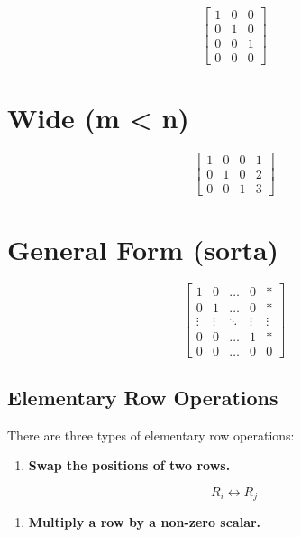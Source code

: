 \documentclass[
  letterpaper,
  DIV=11,
  numbers=noendperiod]{scrreprt}
\providecommand{\tightlist}{%
  \setlength{\itemsep}{0pt}\setlength{\parskip}{0pt}}\usepackage{longtable,booktabs,array}
\begin{document}
\[
\begin{bmatrix}
    1 & 0 & 0 \\
    0 & 1 & 0 \\
    0 & 0 & 1 \\
    0 & 0 & 0
\end{bmatrix}
\]

\chapter{Wide (m \textless{} n)}

\[
\begin{bmatrix}
  1 & 0 & 0 & 1 \\
  0 & 1 & 0 & 2 \\
  0 & 0 & 1 & 3
\end{bmatrix}
\]

\chapter{General Form (sorta)}

\[
\begin{bmatrix}
    1 & 0 & \dots & 0 & * \\
    0 & 1 & \dots & 0 & * \\
    \vdots & \vdots & \ddots & \vdots & \vdots \\
    0 & 0 & \dots & 1 & * \\
    0 & 0 & \dots & 0 & 0
\end{bmatrix}
\]

\hypertarget{elementary-row-operations}{%
\section*{Elementary Row Operations}\label{elementary-row-operations}}


There are three types of elementary row operations:

\begin{enumerate}
\def\labelenumi{\arabic{enumi}.}
\tightlist
\item
  \textbf{Swap the positions of two rows.}
\end{enumerate}

\[
R_i \leftrightarrow R_j
\]

\begin{enumerate}
\def\labelenumi{\arabic{enumi}.}
\setcounter{enumi}{1}
\tightlist
\item
  \textbf{Multiply a row by a non-zero scalar.}
\end{enumerate}
\end{document}

